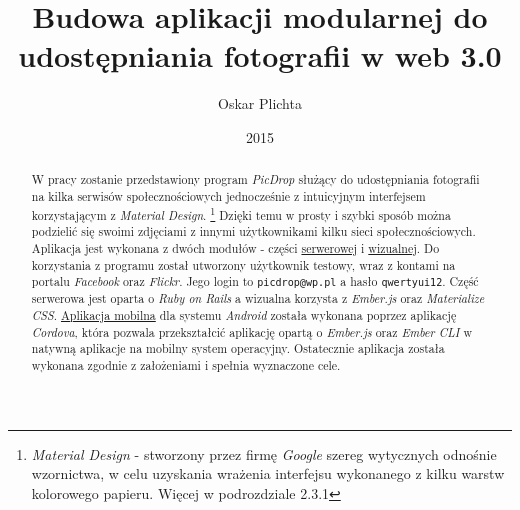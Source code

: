 \documentclass[openright]{xmgr}
\author   {Oskar Plichta}
\title    {Budowa aplikacji modularnej do udostępniania fotografii  w web 3.0}
\date     {2015}
\begin{document}
\begin{abstract}
W pracy zostanie przedstawiony program \textit{PicDrop} służący do udostępniania fotografii na kilka serwisów społecznościowych jednocześnie z intuicyjnym interfejsem korzystającym z \textit{Material Design}. \footnote{\textit{Material Design} - stworzony przez firmę \textit{ Google} szereg wytycznych odnośnie wzornictwa, w celu uzyskania wrażenia interfejsu wykonanego z kilku warstw kolorowego papieru. Więcej w podrozdziale 2.3.1} Dzięki temu w prosty i szybki sposób można podzielić się swoimi zdjęciami z innymi użytkownikami kilku sieci społecznościowych. Aplikacja jest wykonana z dwóch modułów - części \href{https://picdrop2.herokuapp.com/}{serwerowej} i \href{https://picdropember.herokuapp.com/}{wizualnej}. Do korzystania z programu został utworzony użytkownik testowy, wraz z kontami na portalu \textit{Facebook} oraz \textit{Flickr}. Jego login to \verb|picdrop@wp.pl| a hasło \verb|qwertyui12|.  Część serwerowa jest oparta o \textit{Ruby on Rails} a wizualna korzysta z \textit{Ember.js} oraz \textit{Materialize CSS}. \href{https://drive.google.com/file/d/0B3-ow_b9lUQGYlVnVkhIel90Sjg/view?usp=sharing}{Aplikacja mobilna} dla systemu \textit{Android}  została wykonana poprzez aplikację \textit{Cordova}, która pozwala przekształcić aplikację opartą o \textit{Ember.js} oraz \textit{Ember CLI} w natywną aplikacje na mobilny system operacyjny. Ostatecznie aplikacja została wykonana zgodnie z założeniami i spełnia wyznaczone cele.

\end{abstract}
\end{document}
